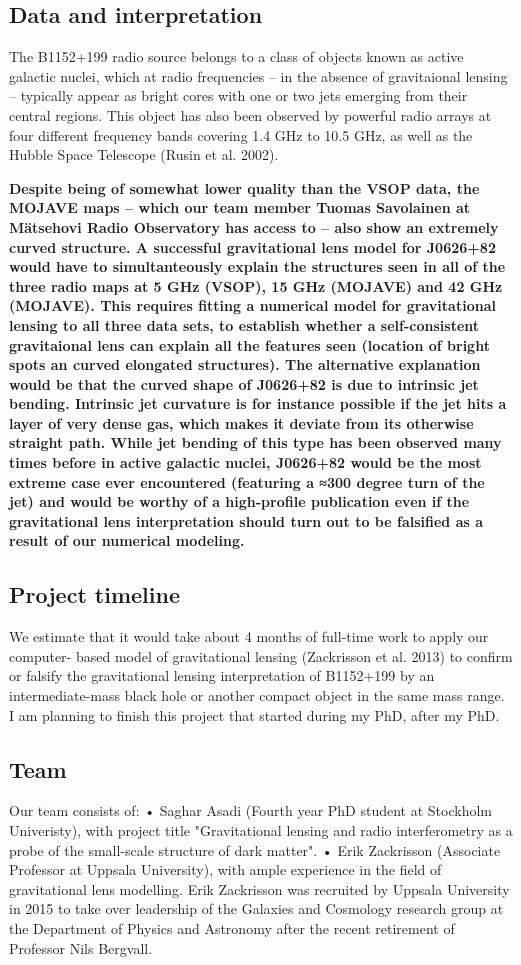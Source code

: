 \documentclass[a4paper, 11pt]{article}
\begin{document}
\subsection{Data and interpretation}
The B1152+199 radio source belongs to a class of objects known as active galactic nuclei, which at radio frequencies – in the absence of gravitaional lensing – typically appear as bright cores with one or two jets emerging from their central regions. This object has also been observed by powerful radio arrays at four different frequency bands covering 1.4 GHz to 10.5 GHz, as well as the Hubble Space Telescope (Rusin et al. 2002).


{\bf Despite being of somewhat lower quality than the VSOP data, the MOJAVE maps – which our team member Tuomas Savolainen at Mätsehovi Radio Observatory has access to – also show an extremely curved structure. A successful gravitational lens model for J0626+82 would have to simultanteously explain the structures seen in all of the three radio maps at 5 GHz (VSOP), 15 GHz (MOJAVE) and 42 GHz (MOJAVE). This requires fitting a numerical model for gravitational lensing to all three data sets, to establish whether a self-consistent gravitaional lens can explain all the features seen (location of bright spots an curved elongated structures). The alternative explanation would be that the curved shape of J0626+82 is due to intrinsic jet bending. Intrinsic jet curvature is for instance possible if the jet hits a layer of very dense gas, which makes it deviate from its otherwise straight path. While jet bending of this type has been observed many times before in active galactic nuclei, J0626+82 would be the most extreme case ever encountered (featuring a ≈300 degree turn of the jet) and would be worthy of a high-profile publication even if the gravitational lens interpretation should turn out to be falsified as a result of our numerical modeling.}

\subsection{Project timeline}
We estimate that it would take about 4 months of full-time work to apply our computer- based model of gravitational lensing (Zackrisson et al. 2013) to confirm or falsify the gravitational lensing interpretation of B1152+199 by an intermediate-mass black hole or another compact object in the same mass range. I am planning to finish this project that started during my PhD, after my PhD.


\subsection{Team}
Our team consists of:
• Saghar Asadi (Fourth year PhD student at Stockholm Univeristy), with project title "Gravitational lensing and radio interferometry as a probe of the small-scale structure of dark matter".
• Erik Zackrisson (Associate Professor at Uppsala University), with ample experience in the field of gravitational lens modelling. Erik Zackrisson was recruited by Uppsala University in 2015 to take over leadership of the Galaxies and Cosmology research group at the Department of Physics and Astronomy after the recent retirement of Professor Nils Bergvall.
\end{document}
